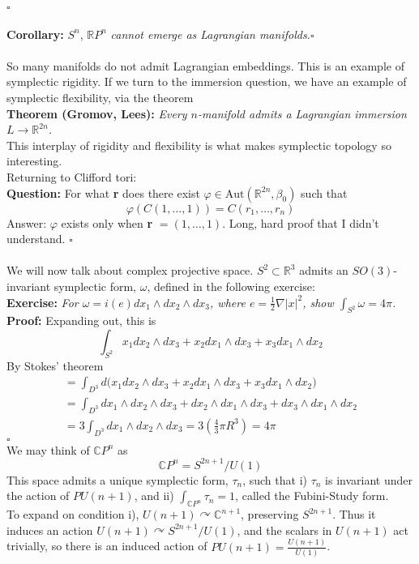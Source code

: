 \documentclass[12pt]{report}
\theoremstyle{definition}
\theoremstyle{remark}
\numberwithin{equation}{section}
\def\acts{\curvearrowright}
\theoremstyle{definition}
\newcommand{\bb}[1]{\mathbb{#1}}
\newcommand{\mqed}{\hfill\newline\null \hfill$\square$\\ }
\begin{document}
\mqed
\\
\textbf{Corollary: }$S^n$, $\bb RP^n$ \textit{cannot emerge as Lagrangian manifolds.}\mqed\\
So many manifolds do not admit Lagrangian embeddings. This is an example of symplectic rigidity. If we turn to the immersion question, we have an example of symplectic flexibility, via the theorem\\
\textbf{Theorem (Gromov, Lees): } \textit{Every $n$-manifold admits a Lagrangian immersion $L \to \bb R^{2n}$.}\\
This interplay of rigidity and flexibility is what makes symplectic topology so interesting. \\
Returning to Clifford tori: \\
\textbf{Question: }For what \textbf{r} does there exist $\varphi \in \text{Aut}(\bb R^{2n},\beta_0)$ such that 
$$
	\varphi(C(1,\dots,1)) = C(r_1,\dots,r_n)
$$
Answer: $\varphi$ exists only when \textbf{r} $= (1,\dots,1)$. Long, hard proof that I didn't understand. \mqed \\
We will now talk about complex projective space. $S^2 \subset\bb R^3$ admits an $SO(3)$-invariant symplectic form, $\omega$, defined in the following exercise:\\
\textbf{Exercise: }\textit{For $\omega = i(e)dx_1 \wedge dx_2 \wedge dx_3$, where $e = \frac{1}{2}\nabla |x|^2$, show $\int_{S^2} \omega = 4\pi$. }\\
\textbf{Proof: }Expanding out, this is 
$$
	\int_{S^2} x_1 dx_2 \wedge dx_3 + x_2 dx_1 \wedge dx_3 + x_3 dx_1 \wedge dx_2
$$
By Stokes' theorem 
\begin{gather*}
	= \int_{D^3} d\Big(x_1 dx_2 \wedge dx_3 + x_2 dx_1 \wedge dx_3 + x_3 dx_1 \wedge dx_2	\Big)\\
	= \int_{D^3} dx_1 \wedge dx_2 \wedge dx_3 + dx_2 \wedge dx_1 \wedge dx_3 + dx_3 \wedge dx_1 \wedge dx_2\\
	= 3\int_{D^3}dx_1 \wedge dx_2 \wedge dx_3 = 3\left(\frac{4}{3}\pi R^3\right) = 4\pi 
\end{gather*}
\mqed
We may think of $\bb CP^n$ as 
$$
	\bb CP^n = S^{2n+1}\big/U(1)
$$
This space admits a unique symplectic form, $\tau_n$, such that i) $\tau_n$ is invariant under the action of $PU(n+1)$, and ii) $\int_{\bb CP^n} \tau_n = 1$, called the Fubini-Study form.\\
To expand on condition i), $U(n+1) \acts \bb C^{n+1}$, preserving $S^{2n+1}$. Thus it induces an action $U(n+1) \acts S^{2n+1}/U(1)$, and the scalars in $U(n+1)$ act trivially, so there is an induced action of $PU(n+1) = \frac{U(n+1)}{U(1)}$.
\end{document}
